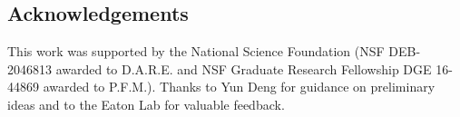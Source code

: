 \documentclass[11pt]{article}
\begin{document}




\subsection{Acknowledgements}
This work was supported by the National Science Foundation 
(NSF DEB-2046813 awarded to D.A.R.E. and NSF Graduate Research Fellowship DGE 16-44869 awarded 
to P.F.M.). Thanks to Yun Deng for guidance on preliminary ideas and to the Eaton Lab for valuable feedback.







\end{document}
